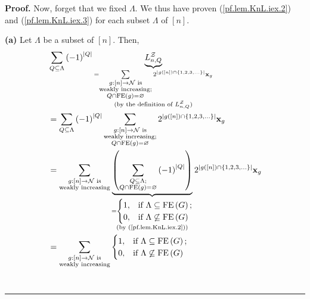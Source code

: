 \documentclass[numbers=enddot,12pt,final,onecolumn,notitlepage]{scrartcl}%
\theoremstyle{definition}
\newenvironment{proof}[1][Proof]{\noindent\textbf{#1.} }{\ \rule{0.5em}{0.5em}}
\let\sumnonlimits\sum
\renewcommand{\sum}{\sumnonlimits\limits}
\begin{document}
\begin{proof}
Now, forget that we fixed $\Lambda$. We thus have proven
(\ref{pf.lem.KnL.iex.2}) and (\ref{pf.lem.KnL.iex.3}) for each subset
$\Lambda$ of $\left[  n\right]  $.

\textbf{(a)} Let $\Lambda$ be a subset of $\left[  n\right]  $. Then,%
\begin{align*}
&  \sum_{Q\subseteq\Lambda}\left(  -1\right)  ^{\left\vert Q\right\vert
}\underbrace{L_{n,Q}^{\mathcal{Z}}}_{\substack{=\sum_{\substack{g:\left[
n\right]  \rightarrow\mathcal{N}\text{ is}\\\text{weakly increasing;}%
\\Q\cap\operatorname*{FE}\left(  g\right)  =\varnothing}}2^{\left\vert
g\left(  \left[  n\right]  \right)  \cap\left\{  1,2,3,\ldots\right\}
\right\vert }\mathbf{x}_{g}\\\text{(by the definition of }L_{n,Q}%
^{\mathcal{Z}}\text{)}}}\\
&  =\sum_{Q\subseteq\Lambda}\left(  -1\right)  ^{\left\vert Q\right\vert }%
\sum_{\substack{g:\left[  n\right]  \rightarrow\mathcal{N}\text{
is}\\\text{weakly increasing;}\\Q\cap\operatorname*{FE}\left(  g\right)
=\varnothing}}2^{\left\vert g\left(  \left[  n\right]  \right)  \cap\left\{
1,2,3,\ldots\right\}  \right\vert }\mathbf{x}_{g}\\
&  =\sum_{\substack{g:\left[  n\right]  \rightarrow\mathcal{N}\text{
is}\\\text{weakly increasing}}}\underbrace{\left(  \sum_{\substack{Q\subseteq
\Lambda;\\Q\cap\operatorname*{FE}\left(  g\right)  =\varnothing}}\left(
-1\right)  ^{\left\vert Q\right\vert }\right)  }_{\substack{=%
\begin{cases}
1, & \text{if }\Lambda\subseteq\operatorname*{FE}\left(  G\right)  ;\\
0, & \text{if }\Lambda\not \subseteq \operatorname*{FE}\left(  G\right)
\end{cases}
\\\text{(by (\ref{pf.lem.KnL.iex.2}))}}}2^{\left\vert g\left(  \left[
n\right]  \right)  \cap\left\{  1,2,3,\ldots\right\}  \right\vert }%
\mathbf{x}_{g}\\
&  =\sum_{\substack{g:\left[  n\right]  \rightarrow\mathcal{N}\text{
is}\\\text{weakly increasing}}}%
\begin{cases}
1, & \text{if }\Lambda\subseteq\operatorname*{FE}\left(  G\right)  ;\\
0, & \text{if }\Lambda\not \subseteq \operatorname*{FE}\left(  G\right)

\end{cases}
\end{align*}
\end{proof}
\end{document}
